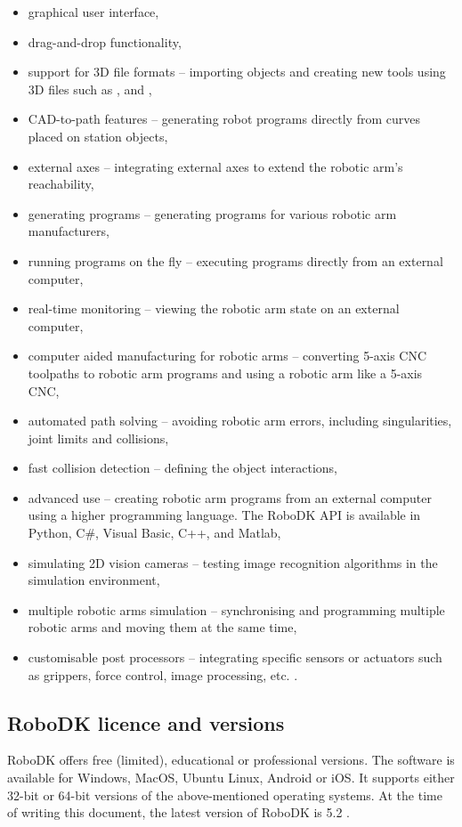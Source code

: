 \begin{itemize}
\item graphical user interface,
\item drag-and-drop functionality, 
\item support for 3D file formats -- importing objects and creating new tools using 3D files such as ,  and ,
\item CAD-to-path features -- generating robot programs directly from curves placed on station objects,
\item external axes -- integrating external axes to extend the robotic arm’s reachability,
\item generating programs -- generating programs for various robotic arm manufacturers,
\item running programs on the fly -- executing programs directly from an external computer,
\item real-time monitoring -- viewing the robotic arm state on an external computer,
\item computer aided manufacturing for robotic arms -- converting 5-axis CNC toolpaths to robotic arm programs and using a robotic arm like a 5-axis CNC,
\item automated path solving -- avoiding robotic arm errors, including singularities, joint limits and collisions,
\item fast collision detection -- defining the object interactions, 
\item advanced use -- creating robotic arm programs from an external computer using a higher programming language. The RoboDK API is available in Python, C\#, Visual Basic, C++, and Matlab,
\item simulating 2D vision cameras -- testing image recognition algorithms in the simulation environment,
\item multiple robotic arms simulation -- synchronising and programming multiple robotic arms and moving them at the same time, 
\item customisable post processors -- integrating specific sensors or actuators such as grippers, force control, image processing, etc. \cite{robodkfeatures}.
\end{itemize}

\subsection{RoboDK licence and versions}

RoboDK offers free (limited), educational or professional versions. 
The software is available for Windows, MacOS, Ubuntu Linux, Android or iOS. It supports either 32-bit or 64-bit versions of the above-mentioned operating systems. At the time of writing this document, the latest version of RoboDK is 5.2 \cite{robodkversions}. 


